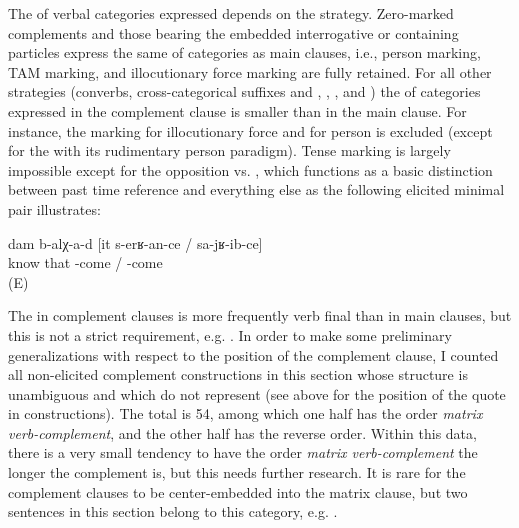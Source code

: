 The  of verbal categories expressed depends on the  strategy. Zero-marked complements and those bearing the embedded interrogative  or containing  particles express the same  of categories as main clauses, i.e., person marking, TAM marking, and illocutionary force marking are fully retained. For all other strategies (converbs, cross-categorical suffixes  and , , , and ) the  of categories expressed in the complement clause is smaller than in the main clause. For instance, the marking for illocutionary force and for person is excluded (except for the  with its rudimentary person paradigm). Tense marking is largely impossible except for the opposition  vs. , which functions as a basic distinction between past time reference and everything else as the following elicited minimal pair illustrates:
%
\begin{exe}
	\ex	\label{ex:‎I know that he will come / came}
	\gll	dam	b-alχ-a-d	[it	s-erʁ-an-ce	/	sa-jʁ-ib-ce]\\
			know	that	-come	/	-come\\
	\glt	{} (E)
\end{exe}

The  in complement clauses is more frequently verb final than in main clauses, but this is not a strict requirement, e.g. . In order to make some preliminary generalizations with respect to the position of the complement clause, I counted all non-elicited complement constructions in this section whose structure is unambiguous and which do not represent  (see  above for the position of the quote in  constructions). The total  is 54, among which one half has the order \textit{matrix verb-complement}, and the other half has the reverse order. Within this data, there is a very small tendency to have the order \textit{matrix verb-complement} the longer the complement is, but this needs further research. It is rare for the complement clauses to be center-embedded into the matrix clause, but two sentences in this section belong to this category, e.g. .

